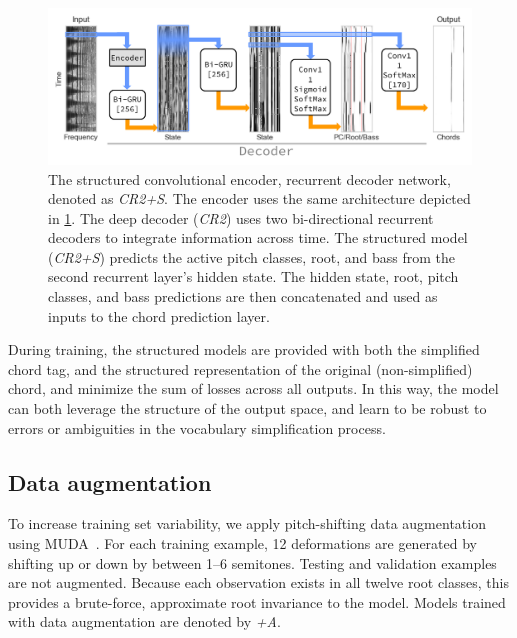 \documentclass{article}
\begin{document}
\begin{figure}
    \centering
    \includegraphics[width=\columnwidth]{crnn2}
    \caption{The structured convolutional encoder, recurrent decoder network, denoted as \emph{CR2+S}.
    The encoder uses the same architecture depicted in \cref{fig:crnn2}.
    The deep decoder (\emph{CR2}) uses two bi-directional recurrent decoders to integrate information across time.
    The structured model (\emph{CR2+S}) predicts the active pitch classes, root, and bass from the second recurrent layer's hidden state.
    The hidden state, root, pitch classes, and bass predictions are then concatenated and used as inputs to the chord prediction layer.\label{fig:crnn2}}
\end{figure}


During training, the structured models are provided with both the simplified chord tag, and the structured representation of the original (non-simplified) chord, and minimize the sum of losses across all outputs.
In this way, the model can both leverage the structure of the output space, and learn to be robust to errors or ambiguities in the vocabulary simplification process.


\subsection{Data augmentation}
\label{sec:muda}
To increase training set variability, we apply pitch-shifting data augmentation using MUDA~\cite{mcfee2015software}.
For each training example, 12 deformations are generated by shifting up or down by between 1--6 semitones.
Testing and validation examples are not augmented.
Because each observation exists in all twelve root classes, this provides a brute-force, approximate root invariance to the model.
Models trained with data augmentation are denoted by \emph{+A}.
\end{document}
